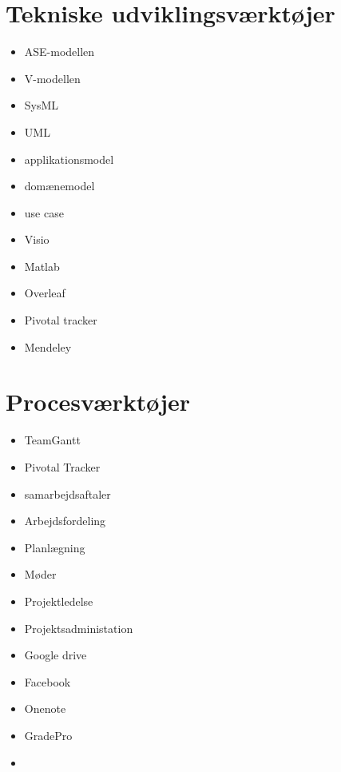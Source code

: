 




































\section*{Tekniske udviklingsværktøjer}
\begin{itemize}
\item ASE-modellen
\item V-modellen
\item SysML
\item UML
\item applikationsmodel
\item domænemodel
\item use case
\item Visio
\item Matlab
\item Overleaf
\item Pivotal tracker
\item Mendeley
\end{itemize}






\section*{Procesværktøjer}
\begin{itemize}
\item TeamGantt
\item Pivotal Tracker
\item samarbejdsaftaler
\item Arbejdsfordeling
\item Planlægning
\item Møder
\item Projektledelse
\item Projektsadministation
\item Google drive
\item Facebook
\item Onenote
\item GradePro
\item 

\end{itemize}











